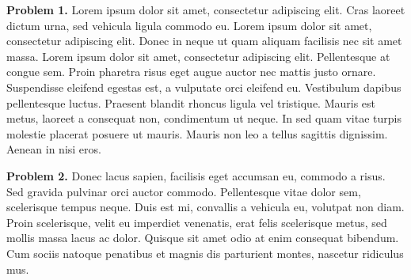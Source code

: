 \documentclass[12pt]{article}
\begin{document}
{\bfseries Problem 1.}
Lorem ipsum dolor sit amet, consectetur adipiscing elit. Cras laoreet
dictum urna, sed vehicula ligula commodo eu. Lorem ipsum dolor sit
amet, consectetur adipiscing elit. Donec in neque ut quam aliquam
facilisis nec sit amet massa. Lorem ipsum dolor sit amet, consectetur
adipiscing elit. Pellentesque at congue sem. Proin pharetra risus
eget augue auctor nec mattis justo ornare. Suspendisse eleifend
egestas est, a vulputate orci eleifend eu. Vestibulum dapibus
pellentesque luctus. Praesent blandit rhoncus ligula vel tristique.
Mauris est metus, laoreet a consequat non, condimentum ut neque. In
sed quam vitae turpis molestie placerat posuere ut mauris. Mauris non leo a
tellus sagittis dignissim. Aenean in nisi eros.

{\bfseries Problem 2.}
Donec lacus sapien, facilisis eget accumsan eu, commodo a risus. Sed
gravida pulvinar orci auctor commodo. Pellentesque vitae dolor sem,
scelerisque tempus neque. Duis est mi, convallis a vehicula eu, volutpat
non diam. Proin scelerisque, velit eu imperdiet venenatis, erat felis
scelerisque metus, sed mollis massa lacus ac dolor. Quisque sit amet odio
at enim consequat bibendum. Cum sociis natoque penatibus et magnis dis
parturient montes, nascetur ridiculus mus.
\end{document}
